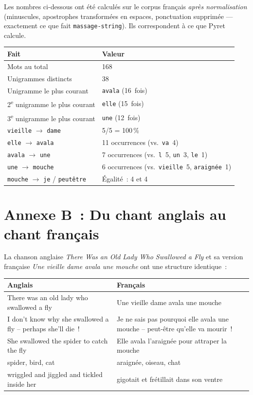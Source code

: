\documentclass[12pt,a4paper]{article}
\begin{document}
Les nombres ci-dessous ont été calculés sur le corpus français \emph{après normalisation} (minuscules, apostrophes transformées en espaces, ponctuation supprimée — exactement ce que fait \texttt{massage-string}). Ils correspondent à ce que Pyret calcule.

\begin{center}
\begin{tabularx}{\textwidth}{l X}
  \toprule
  \textbf{Fait} & \textbf{Valeur} \\
  \midrule
  Mots au total & 168 \\
  Unigrammes distincts & 38 \\
  Unigramme le plus courant & \texttt{avala} (16~fois) \\
  2\textsuperscript{e} unigramme le plus courant & \texttt{elle} (15~fois) \\
  3\textsuperscript{e} unigramme le plus courant & \texttt{une} (12~fois) \\
  \texttt{vieille} $\to$ \texttt{dame} & 5/5 = 100\,\% \\
  \texttt{elle} $\to$ \texttt{avala} & 11 occurrences (vs.\ \texttt{va}~4) \\
  \texttt{avala} $\to$ \texttt{une} & 7 occurrences (vs.\ \texttt{l}~5, \texttt{un}~3, \texttt{le}~1) \\
  \texttt{une} $\to$ \texttt{mouche} & 6 occurrences (vs.\ \texttt{vieille}~5, \texttt{araignée}~1) \\
  \texttt{mouche} $\to$ \texttt{je} / \texttt{peutêtre} & Égalité~: 4 et 4 \\
  \bottomrule
\end{tabularx}
\end{center}

\section*{Annexe B~: Du chant anglais au chant français}

La chanson anglaise \emph{There Was an Old Lady Who Swallowed a Fly} et sa version française \emph{Une vieille dame avala une mouche} ont une structure identique~:

\begin{center}
\begin{tabularx}{\textwidth}{X X}
  \toprule
  \textbf{Anglais} & \textbf{Français} \\
  \midrule
  There was an old lady who swallowed a fly & Une vieille dame avala une mouche \\
  I don't know why she swallowed a fly -- perhaps she'll die~! & Je ne sais pas pourquoi elle avala une mouche -- peut-être qu'elle va mourir~! \\
  She swallowed the spider to catch the fly & Elle avala l'araignée pour attraper la mouche \\
  spider, bird, cat & araignée, oiseau, chat \\
  wriggled and jiggled and tickled inside her & gigotait et frétillait dans son ventre \\
  \bottomrule
\end{tabularx}
\end{center}
\end{document}
